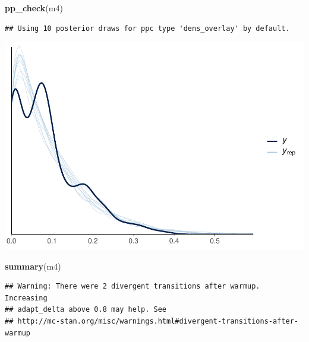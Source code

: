 \documentclass[
]{article}
\newenvironment{Shaded}{\begin{snugshade}}{\end{snugshade}}
\newcommand{\FunctionTok}[1]{\textcolor[rgb]{0.13,0.29,0.53}{\textbf{#1}}}
\newcommand{\NormalTok}[1]{#1}
\begin{document}
\begin{Shaded}
\begin{Highlighting}[]
\FunctionTok{pp\_check}\NormalTok{(m4)}
\end{Highlighting}
\end{Shaded}

\begin{verbatim}
## Using 10 posterior draws for ppc type 'dens_overlay' by default.
\end{verbatim}

\includegraphics{params_analyses_files/figure-latex/unnamed-chunk-5-2.pdf}

\begin{Shaded}
\begin{Highlighting}[]
\FunctionTok{summary}\NormalTok{(m4)}
\end{Highlighting}
\end{Shaded}

\begin{verbatim}
## Warning: There were 2 divergent transitions after warmup. Increasing
## adapt_delta above 0.8 may help. See
## http://mc-stan.org/misc/warnings.html#divergent-transitions-after-warmup
\end{verbatim}
\end{document}
